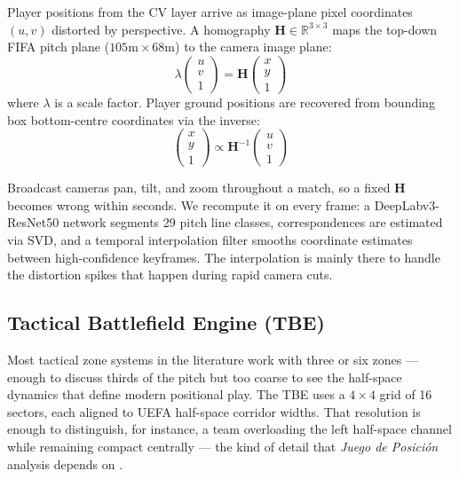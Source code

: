 \documentclass[conference]{IEEEtran}
\begin{document}
Player positions from the CV layer arrive as image-plane pixel coordinates $(u, v)$ distorted by perspective. A homography $\mathbf{H} \in \mathbb{R}^{3 \times 3}$ maps the top-down FIFA pitch plane ($105\text{m} \times 68\text{m}$) to the camera image plane:
\begin{equation}
    \lambda \begin{pmatrix} u \\ v \\ 1 \end{pmatrix} =
    \mathbf{H} \begin{pmatrix} x \\ y \\ 1 \end{pmatrix}
\end{equation}
where $\lambda$ is a scale factor. Player ground positions are recovered from bounding box bottom-centre coordinates via the inverse:
\begin{equation}
    \begin{pmatrix} x \\ y \\ 1 \end{pmatrix} \propto
    \mathbf{H}^{-1} \begin{pmatrix} u \\ v \\ 1 \end{pmatrix}
\end{equation}

Broadcast cameras pan, tilt, and zoom throughout a match, so a fixed $\mathbf{H}$ becomes wrong within seconds. We recompute it on every frame: a DeepLabv3-ResNet50 network segments 29 pitch line classes, correspondences are estimated via SVD, and a temporal interpolation filter smooths coordinate estimates between high-confidence keyframes. The interpolation is mainly there to handle the distortion spikes that happen during rapid camera cuts.

\subsection{Tactical Battlefield Engine (TBE)}

Most tactical zone systems in the literature work with three or six zones --- enough to discuss thirds of the pitch but too coarse to see the half-space dynamics that define modern positional play. The TBE uses a $4 \times 4$ grid of 16 sectors, each aligned to UEFA half-space corridor widths. That resolution is enough to distinguish, for instance, a team overloading the left half-space channel while remaining compact centrally --- the kind of detail that \textit{Juego de Posici\'{o}n} analysis depends on \cite{memmert2018}.
\end{document}

